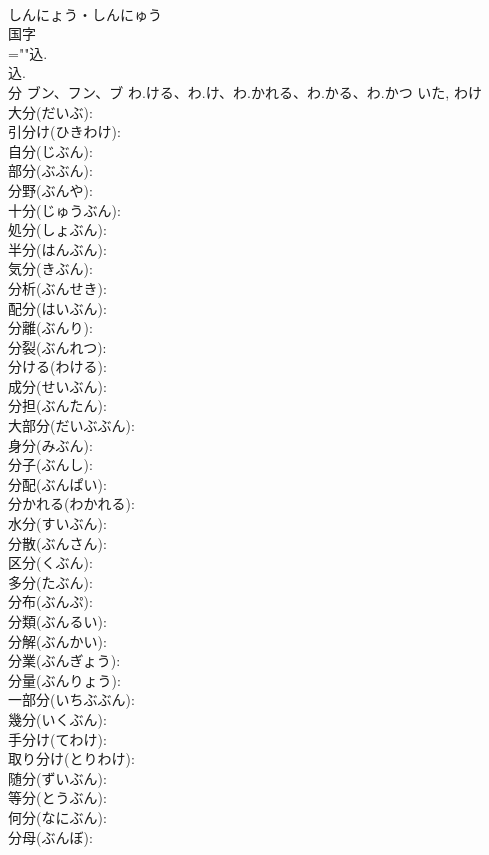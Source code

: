 \documentclass[8pt]{extreport}
\begin{document}
\begin{CJK}{UTF8}{min}
\\	しんにょう・しんにゅう	
\\	国字 
\\	=""込.
\\	込.
\\	分	ブン、フン、ブ	わ.ける、わ.け、わ.かれる、わ.かる、わ.かつ	いた, わけ	
\\	大分(だいぶ): 
\\	引分け(ひきわけ): 
\\	自分(じぶん): 
\\	部分(ぶぶん): 
\\	分野(ぶんや): 
\\	十分(じゅうぶん): 
\\	処分(しょぶん): 
\\	半分(はんぶん): 
\\	気分(きぶん): 
\\	分析(ぶんせき): 
\\	配分(はいぶん): 
\\	分離(ぶんり): 
\\	分裂(ぶんれつ): 
\\	分ける(わける): 
\\	成分(せいぶん): 
\\	分担(ぶんたん): 
\\	大部分(だいぶぶん): 
\\	身分(みぶん): 
\\	分子(ぶんし): 
\\	分配(ぶんぱい): 
\\	分かれる(わかれる): 
\\	水分(すいぶん): 
\\	分散(ぶんさん): 
\\	区分(くぶん): 
\\	多分(たぶん): 
\\	分布(ぶんぷ): 
\\	分類(ぶんるい): 
\\	分解(ぶんかい): 
\\	分業(ぶんぎょう): 
\\	分量(ぶんりょう): 
\\	一部分(いちぶぶん): 
\\	幾分(いくぶん): 
\\	手分け(てわけ): 
\\	取り分け(とりわけ): 
\\	随分(ずいぶん): 
\\	等分(とうぶん): 
\\	何分(なにぶん): 
\\	分母(ぶんぼ): 

\end{CJK}
\end{document}
